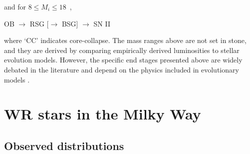 and for $8 \le M_i \le 18\,$ \Msun{},

\centerline{OB $\longrightarrow$ RSG [$\longrightarrow$ BSG] $\longrightarrow$ SN II}

where `CC' indicates core-collapse. The mass ranges above are not set in stone, and they are derived by comparing empirically derived luminosities to stellar evolution models. However, the specific end stages presented above are widely debated in the literature and depend on the physics included in evolutionary models \citep[e.g., see][]{heger_how_2003,woosley_supernova_2006,2017LamersLevesque}.

\section{WR stars in the Milky Way}


\subsection{Observed distributions}

